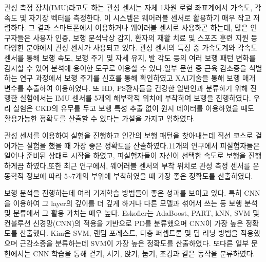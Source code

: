 \documentclass{article}
\begin{document}
관성 측정 장치(IMU)라고도 하는 관성 센서는 자체 1차원 로컬 좌표계에서
가속도, 각속도 및 자기장 벡터를 측정한다.\cite{noauthor_sensors_nodate} 이
시스템은 웨어러블 센서로 활용하기 매우 작고 저렴하다. 그 결과
스마트폰에서 이용하거나 웨어러블 센서로 사용하곤
하는데\cite{ngo_largest_2014,ngo_similar_2015}, 많은 연구자들은 사용자
인증\cite{trung_phase_2011}, 보행 분석\cite{tao_gait_2012,rashid_gait_2019,noauthor_sensors_nodate,ngo_largest_2014,ngo_similar_2015}낙상
감지\cite{noury_fall_2007}, 환자의 재활 치료\cite{cifuentes_development_2012} 및 스포츠
훈련 지원\cite{cheng_analysis_2008} 등 다양한 분야에서 관성 센서가 사용되고
있다. 관성 센서의 특징 중 가속도계와 각속도 센서를 통해 보행 속도, 보행
주기 및 자세 유지, 발 각도 등의 여러 보행 패턴 변화를 감지할 수 있어
분석에 용이한 도구로 이용할 수 있다.\cite{caramia_imu-based_2018,dehzangi_imu-based_2017,kim_identification_2021}일부 문헌 중
근육 감소증을 식별하는 연구 과정에서 보행 주기를 신호를 통해 확인하였고
XAI기술을 통해 보행 매개 변수를 추출하여 이용하였다.\cite{kim_identification_2021}
또 HD, PS환자들을 건강한 일반인과 분류하기 위해 진행한 실험에서는 IMU
센서를 5개의 해부학적 위치에 부착하여 보행을
진행하였다.\cite{mannini_machine_2016} 우리 실험은 CKD의 유무를 두고 보행 특성
추출 없이 원시 데이터를 이용하였을 때도 활용가능한 정확도를 산출할 수
있다는 가설을 가지고 임하였다.

관성 센서를 이용하여 실험을 진행하고 인간의 보행 패턴을 찾아내는데 직선
코스로 걸어가는 실험을 했을 때 가장 좋은 정확도를
산출하였다.\cite{bohannon_deficits_1995,painter_physical_2013,jin_comparison_2017,caramia_imu-based_2018,dehzangi_imu-based_2017,kim_identification_2021}11개의 연구에서
피실험자들은 일어나 준비된 상태로 시작을 하였고, 피실험자들이 자신이
선택한 속도로 보행을 진행하게끔
하였다.\cite{bohannon_deficits_1995,abe_determinants_2016,painter_physical_2013,jin_comparison_2017,tao_gait_2012,rashid_gait_2019,ngo_similar_2015,caramia_imu-based_2018,dehzangi_imu-based_2017,kim_identification_2021,mannini_machine_2016}또한 최근 연구에서, 웨어러블
센서의 부착 위치로 관성 측정 센서를 운동학적 정보에 따라
5\textasciitilde7개의 부위에 부착하였을 때 가장 좋은 정확도를
산출하였다. \cite{caramia_imu-based_2018,mannini_machine_2016}

보행 분석을 진행하는데 여러 기계학습 방법들이 좋은 성과를 보이고 있다.
특히 CNN을 이용하여 그 layer의 깊이를 더 깊게 하거나 다른 모델과 섞어서
쓰는 등 보행 분석 및 분류에서 그 활용 가치는 매우
높다.\cite{rashid_gait_2019,dehzangi_imu-based_2017,kim_identification_2021,mannini_machine_2016,eskofier_recent_2016,wang_gait_2020} Eskofier\cite{eskofier_recent_2016}는
AdaBoost, PART, kNN, SVM 및 컨볼루션 신경망(CNN)의 적용을 기반으로 PD를
분류했으며 CNN이 가장 높은 정확도를 산출했다. Kim\cite{kim_identification_2021}은
SVM, 랜덤 포레스트, 다층 퍼셉트론 및 딥 러닝 방법을 적용했으며
근감소증을 분류하는데 SVM이 가장 높은 정확도를 산출하였다. 또다른 일부
문헌에서는 CNN 학습을 통해 걷기, 서기, 앉기, 눕기, 조깅과 같은 동작을
분류하였다.\cite{dehzangi_imu-based_2017}
\end{document}

